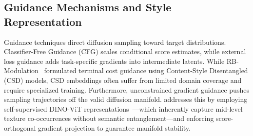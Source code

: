 \subsection{Guidance Mechanisms and Style Representation}
Guidance techniques direct diffusion sampling toward target distributions. Classifier-Free Guidance (CFG) scales conditional score estimates, while external loss guidance adds task-specific gradients into intermediate latents. While RB-Modulation~\cite{rout2024rbmodulation} formulated terminal cost guidance using Content-Style Disentangled (CSD) models, CSD embeddings often suffer from limited domain coverage and require specialized training. Furthermore, unconstrained gradient guidance pushes sampling trajectories off the valid diffusion manifold. \method addresses this by employing self-supervised DINO-ViT representations~\cite{caron2021emerging,oquab2023dinov2}---which inherently capture mid-level texture co-occurrences without semantic entanglement---and enforcing score-orthogonal gradient projection to guarantee manifold stability.

